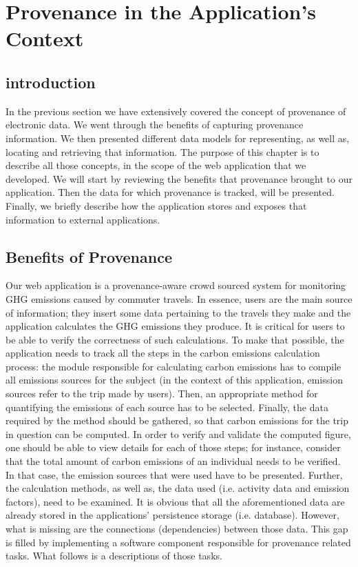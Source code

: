 
\chapter{Provenance in the Application's Context} %
\label{Provenance in the Application Context}

\section{introduction}

In the previous section we have extensively covered the concept of provenance of electronic data. We went through the benefits of capturing provenance information. We then presented different data models for representing, as well as, locating and retrieving that information. The purpose of this chapter is to describe all those concepts, in the scope of the web application that we developed. We will start by reviewing the benefits that provenance brought to our application. Then the data for which provenance is tracked, will be presented. Finally, we briefly describe how the application stores and exposes that information to external applications.

\section{Benefits of Provenance}

Our web application is a provenance-aware crowd sourced system for monitoring GHG emissions caused by commuter travels. In essence, users are the main source of information; they insert some data pertaining to the travels they make and the application calculates the GHG emissions they produce. It is critical for users to be able to verify the correctness of such calculations. To make that possible, the application needs to track all the steps in the carbon emissions calculation process: the module responsible for calculating carbon emissions has to compile all emissions sources for the subject (in the context of this application, emission sources refer to the trip made by users). Then, an appropriate method for quantifying the emissions of each source has to be selected. Finally, the data required by the method should be gathered, so that carbon emissions for the trip in question can be computed.
In order to verify and validate the computed figure, one should be able to view details for each of those steps; for instance, consider that the total amount of carbon emissions of an individual needs to be verified. In that case, the emission sources that were used have to be presented. Further, the calculation methods, as well as, the data used (i.e. activity data and emission factors), need to be examined.
It is obvious that all the aforementioned data are already stored in the applications' persistence storage (i.e. database). However, what is missing are the connections (dependencies) between those data. This gap is filled by implementing a software component responsible for provenance related tasks. What follows is a descriptions of those tasks.

